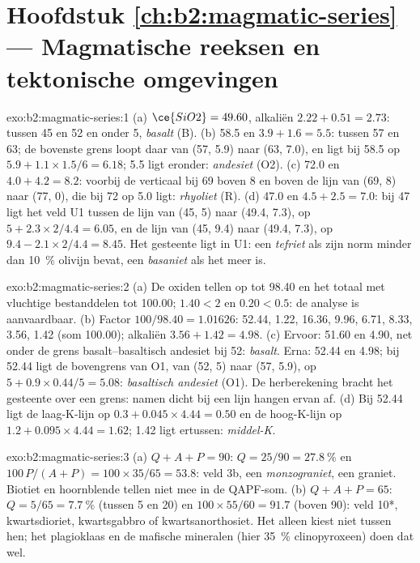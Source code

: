 \section*{Hoofdstuk \ref{ch:b2:magmatic-series} --- Magmatische reeksen en tektonische omgevingen}

\begin{solution}{exo:b2:magmatic-series:1}
(a) $\ce{SiO2} = 49.60$, alkaliën $2.22 + 0.51 = 2.73$: tussen 45 en 52 en onder 5,
\emph{basalt} (B). (b) 58.5 en $3.9 + 1.6 = 5.5$: tussen 57 en 63; de bovenste
grens loopt daar van (57, 5.9) naar (63, 7.0), en ligt bij 58.5 op $5.9 + 1.1\times1.5/6 = 6.18$;
5.5 ligt eronder: \emph{andesiet} (O2). (c) 72.0 en $4.0 + 4.2 = 8.2$:
voorbij de verticaal bij 69 boven 8 en boven de lijn van (69, 8) naar (77, 0), die
bij 72 op 5.0 ligt: \emph{rhyoliet} (R). (d) 47.0 en $4.5 + 2.5 = 7.0$: bij 47 ligt het veld U1
tussen de lijn van (45, 5) naar (49.4, 7.3), op $5 + 2.3\times2/4.4 = 6.05$, en
de lijn van (45, 9.4) naar (49.4, 7.3), op $9.4 - 2.1\times2/4.4 = 8.45$. Het gesteente ligt
in U1: een \emph{tefriet} als zijn norm minder dan \qty{10}{\percent} olivijn bevat, een
\emph{basaniet} als het meer is.
\end{solution}

\begin{solution}{exo:b2:magmatic-series:2}
(a) De oxiden tellen op tot 98.40 en het totaal met vluchtige bestanddelen tot 100.00;
 $1.40 < 2$ en  $0.20 < 0.5$: de analyse is aanvaardbaar. (b) Factor
$100/98.40 = 1.01626$:  52.44,  1.22,  16.36,
 9.96,  6.71,  8.33,  3.56,  1.42
(som 100.00); alkaliën $3.56 + 1.42 = 4.98$. (c) Ervoor: 51.60 en 4.90, net onder de
grens basalt--basaltisch andesiet bij 52: \emph{basalt}. Erna: 52.44 en 4.98; bij
52.44 ligt de bovengrens van O1, van (52, 5) naar (57, 5.9), op $5 + 0.9\times0.44/5
= 5.08$: \emph{basaltisch andesiet} (O1). De herberekening bracht het gesteente over een
grens: namen dicht bij een lijn hangen ervan af. (d) Bij 52.44 ligt de laag-K-lijn op $0.3 +
0.045\times4.44 = 0.50$ en de hoog-K-lijn op $1.2 + 0.095\times4.44 = 1.62$; 1.42
ligt ertussen: \emph{middel-K}.
\end{solution}

\begin{solution}{exo:b2:magmatic-series:3}
(a) $Q + A + P = 90$: $Q = 25/90 = \qty{27.8}{\percent}$ en $100\,P/(A + P) =
100\times35/65 = 53.8$: veld 3b, een \emph{monzograniet}, een graniet. Biotiet en
hoornblende tellen niet mee in de QAPF-som. (b) $Q + A + P = 65$: $Q = 5/65 =
\qty{7.7}{\percent}$ (tussen 5 en 20) en $100\times55/60 = 91.7$ (boven 90): veld
10*, kwartsdioriet, kwartsgabbro of kwartsanorthosiet. Het  alleen kiest
niet tussen hen; het plagioklaas en de mafische mineralen (hier
\qty{35}{\percent} clinopyroxeen) doen dat wel.
\end{solution}

